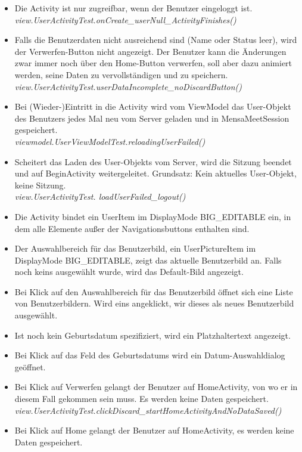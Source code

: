 \documentclass[a4paper]{scrreprt}
\begin{document}
\begin{itemize}
\item Die Activity ist nur zugreifbar, wenn der Benutzer eingeloggt ist.\\
\textit{view.UserActivityTest.onCreate\_userNull\_ActivityFinishes()}
\item Falls die Benutzerdaten nicht ausreichend sind (Name oder Status leer), wird der Verwerfen-Button nicht angezeigt. Der Benutzer kann die Änderungen zwar immer noch über den Home-Button verwerfen, soll aber dazu animiert werden, seine Daten zu vervollständigen und zu speichern.\\
\textit{view.UserActivityTest.userDataIncomplete\_noDiscardButton()}
\item Bei (Wieder-)Eintritt in die Activity wird vom ViewModel das User-Objekt des Benutzers jedes Mal neu vom Server geladen und in MensaMeetSession gespeichert. \\
\textit{viewmodel.UserViewModelTest.reloadingUserFailed()}
\item Scheitert das Laden des User-Objekts vom Server, wird die Sitzung beendet und auf BeginActivity weitergeleitet. Grundsatz: Kein aktuelles User-Objekt, keine Sitzung. \\
\textit{view.UserActivityTest. loadUserFailed\_logout()}
\item Die Activity bindet ein UserItem im DisplayMode BIG\_EDITABLE ein, in dem alle Elemente außer der Navigationsbuttons enthalten sind.
\item Der Auswahlbereich für das Benutzerbild, ein UserPictureItem im DisplayMode BIG\_EDITABLE, zeigt das aktuelle Benutzerbild an. Falls noch keins ausgewählt wurde, wird das Default-Bild angezeigt. 
\item Bei Klick auf den Auswahlbereich für das Benutzerbild öffnet sich eine Liste von Benutzerbildern. Wird eins angeklickt, wir dieses als neues Benutzerbild ausgewählt.
\item Ist noch kein Geburtsdatum spezifiziert, wird ein Platzhaltertext angezeigt.
\item Bei Klick auf das Feld des Geburtsdatums wird ein Datum-Auswahldialog geöffnet.
\item Bei Klick auf Verwerfen gelangt der Benutzer auf HomeActivity, von wo er in diesem Fall gekommen sein muss. Es werden keine Daten gespeichert.\\
\textit{view.UserActivityTest.clickDiscard\_startHomeActivityAndNoDataSaved()}
\item  Bei Klick auf Home gelangt der Benutzer auf HomeActivity, es werden keine Daten gespeichert.\\

\end{itemize}
\end{document}
